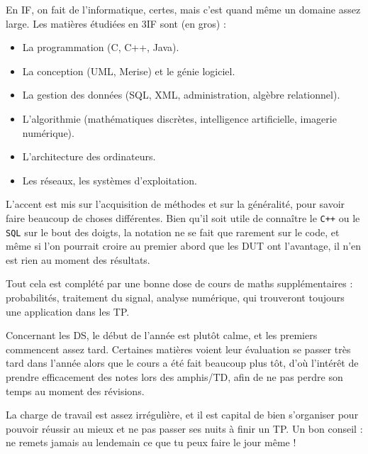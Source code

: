 En IF, on fait de l'informatique, certes, mais c'est quand même un domaine assez
large. Les matières étudiées en 3IF sont (en gros) :
\begin{itemize}
    \item La programmation (C, C++, Java).
    \item La conception (UML, Merise) et le génie logiciel.
    \item La gestion des données (SQL, XML, administration, algèbre relationnel).
    \item L'algorithmie (mathématiques discrètes, intelligence artificielle, imagerie numérique).
    \item L'architecture des ordinateurs.
    \item Les réseaux, les systèmes d'exploitation.
\end{itemize}

L'accent est mis sur l'acquisition de méthodes et sur la généralité, pour savoir faire beaucoup
de choses différentes. Bien qu'il soit utile de connaître le \texttt{C++} ou le \texttt{SQL} sur le bout
des doigts, la notation ne se fait que rarement sur le code, et même si l'on pourrait croire au premier abord que les
DUT ont l'avantage, il n'en est rien au moment des résultats.

Tout cela est complété par une bonne dose de cours de maths supplémentaires : probabilités,
traitement du signal, analyse numérique, qui trouveront toujours une application dans les TP.

Concernant les DS, le début de l'année est plutôt calme, et les premiers
commencent assez tard. Certaines matières voient leur évaluation se
passer très tard dans l'année alors que le cours a été fait beaucoup plus tôt,
d'où l'intérêt de prendre efficacement des notes lors des amphis/TD, afin de ne
pas perdre son temps au moment des révisions.

La charge de travail est assez irrégulière, et il est capital de bien s'organiser pour
pouvoir réussir au mieux et ne pas passer ses nuits à finir un TP. Un bon conseil : ne remets
jamais au lendemain ce que tu peux faire le jour même !
